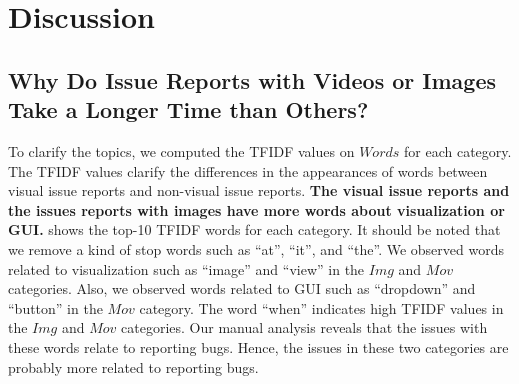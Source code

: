 \section{Discussion}
%

\subsection{Why Do Issue Reports with Videos or Images Take a Longer Time than Others?}
To clarify the topics, we computed the TFIDF values 
on $Words$ for each category. 
The TFIDF values clarify the differences in the appearances of 
words between visual issue reports and 
non-visual issue reports. 
\textbf{The visual issue reports and the issues 
reports with images have more words 
about visualization or GUI.}
 shows the top-10 TFIDF words
for each category.
It should be noted that we remove a kind of stop words such as 
``at'', ``it'', and ``the''. 
We observed words related to visualization such as 
``image'' and ``view'' in the $Img$ and $Mov$ categories. 
Also, we observed words related to GUI such as 
``dropdown'' and ``button'' in the $Mov$ category. 
The word ``when'' indicates high TFIDF values 
in the $Img$ and $Mov$ categories. 
Our manual analysis reveals that the issues with 
these words relate to reporting bugs. 
Hence, the issues in these two categories are 
probably more related to reporting bugs. 